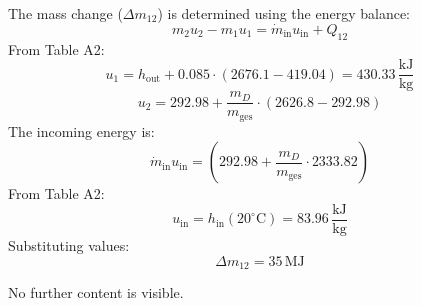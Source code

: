The mass change (\( \Delta m_{12} \)) is determined using the energy balance:  
\[
m_2 u_2 - m_1 u_1 = \dot{m}_{\text{in}} u_{\text{in}} + Q_{12}
\]  
From Table A2:  
\[
u_1 = h_{\text{out}} + 0.085 \cdot (2676.1 - 419.04) = 430.33 \, \frac{\text{kJ}}{\text{kg}}
\]  
\[
u_2 = 292.98 + \frac{m_D}{m_{\text{ges}}} \cdot (2626.8 - 292.98)
\]  
The incoming energy is:  
\[
\dot{m}_{\text{in}} u_{\text{in}} = (292.98 + \frac{m_D}{m_{\text{ges}}} \cdot 2333.82)
\]  
From Table A2:  
\[
u_{\text{in}} = h_{\text{in}}(20^\circ\text{C}) = 83.96 \, \frac{\text{kJ}}{\text{kg}}
\]  
Substituting values:  
\[
\Delta m_{12} = 35 \, \text{MJ}
\]  

No further content is visible.
